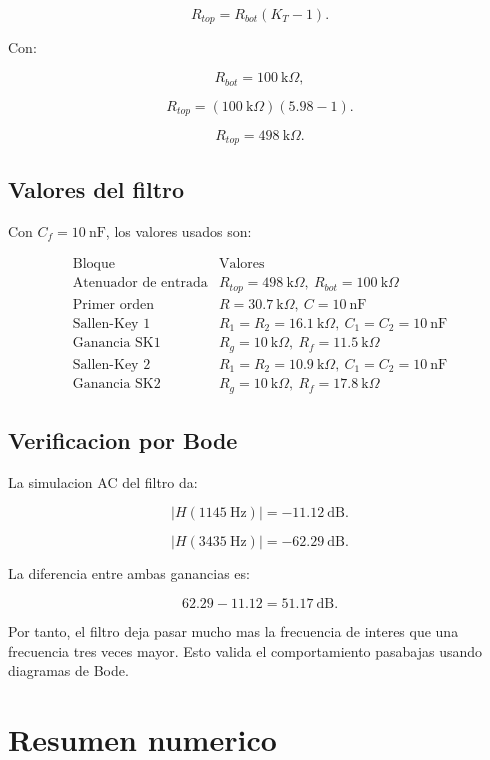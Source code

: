 \documentclass[11pt,letterpaper]{article}
\begin{document}
\[
R_{top}=R_{bot}(K_T-1).
\]

Con:

\[
R_{bot}=100~\text{k}\Omega,
\]

\[
R_{top}=(100~\text{k}\Omega)(5.98-1).
\]

\[
R_{top}=498~\text{k}\Omega.
\]

\subsection{Valores del filtro}

Con \(C_f=10~\text{nF}\), los valores usados son:

\[
\begin{array}{c|c}
\text{Bloque} & \text{Valores} \\
\hline
\text{Atenuador de entrada} & R_{top}=498~\text{k}\Omega,\ R_{bot}=100~\text{k}\Omega\\
\text{Primer orden} & R=30.7~\text{k}\Omega,\ C=10~\text{nF}\\
\text{Sallen-Key 1} & R_1=R_2=16.1~\text{k}\Omega,\ C_1=C_2=10~\text{nF}\\
\text{Ganancia SK1} & R_g=10~\text{k}\Omega,\ R_f=11.5~\text{k}\Omega\\
\text{Sallen-Key 2} & R_1=R_2=10.9~\text{k}\Omega,\ C_1=C_2=10~\text{nF}\\
\text{Ganancia SK2} & R_g=10~\text{k}\Omega,\ R_f=17.8~\text{k}\Omega
\end{array}
\]

\subsection{Verificacion por Bode}

La simulacion AC del filtro da:

\[
|H(1145~\text{Hz})|=-11.12~\text{dB}.
\]

\[
|H(3435~\text{Hz})|=-62.29~\text{dB}.
\]

La diferencia entre ambas ganancias es:

\[
62.29-11.12=51.17~\text{dB}.
\]

Por tanto, el filtro deja pasar mucho mas la frecuencia de interes que una
frecuencia tres veces mayor. Esto valida el comportamiento pasabajas usando
diagramas de Bode.

\section{Resumen numerico}
\end{document}
